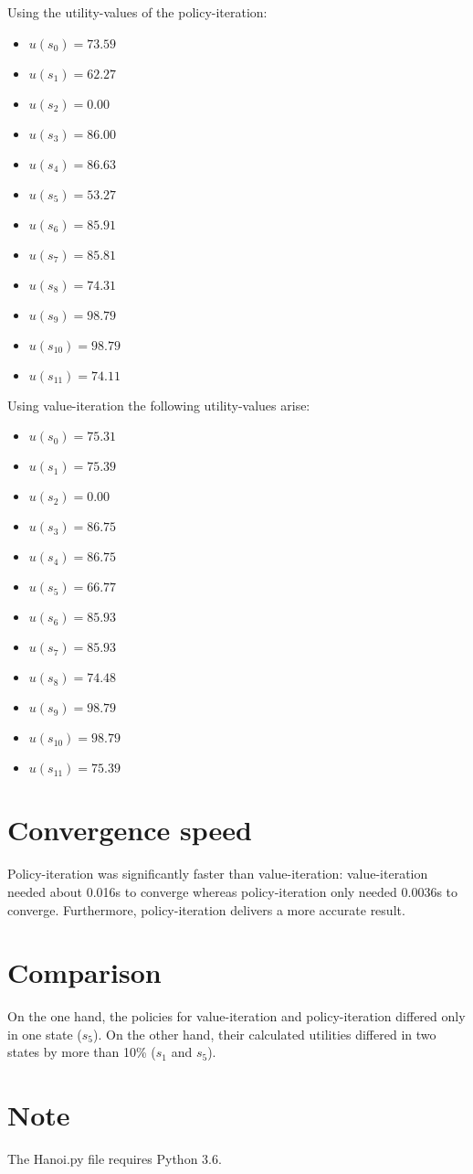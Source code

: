 \documentclass[a4paper]{article}
\begin{document}
\newpage
Using the utility-values of the policy-iteration:
\begin{multicols}{2}
\begin{itemize}
\item $u(s_0) = 73.59 $
\item $u(s_1) = 62.27 $
\item $u(s_2) = 0.00 $
\item $u(s_3) = 86.00 $
\item $u(s_4) = 86.63 $
\item $u(s_5) = 53.27 $
\item $u(s_6) = 85.91 $
\item $u(s_7) = 85.81 $
\item $u(s_8) = 74.31 $
\item $u(s_9) = 98.79 $
\item $u(s_{10}) = 98.79 $
\item $u(s_{11}) = 74.11 $
\end{itemize}
\end{multicols}

\noindent
Using value-iteration the following utility-values arise:
\begin{multicols}{2}
\begin{itemize}
\item $u(s_0) = 75.31 $
\item $u(s_1) = 75.39 $
\item $u(s_2) = 0.00 $
\item $u(s_3) = 86.75 $
\item $u(s_4) = 86.75 $
\item $u(s_5) = 66.77 $
\item $u(s_6) = 85.93 $
\item $u(s_7) = 85.93 $
\item $u(s_8) = 74.48 $
\item $u(s_9) = 98.79 $
\item $u(s_{10}) = 98.79 $
\item $u(s_{11}) = 75.39 $
\end{itemize}
\end{multicols}

\section{Convergence speed}
Policy-iteration was significantly faster than value-iteration: value-iteration needed about 0.016s to converge whereas policy-iteration only needed 0.0036s to converge. Furthermore, policy-iteration delivers a more accurate result.

\section{Comparison}
On the one hand, the policies for value-iteration and policy-iteration differed only in one state ($s_5$). On the other hand, their calculated utilities differed in two states by more than 10\% ($s_1$ and $s_5$).

\section{Note}
The Hanoi.py file requires Python 3.6.
\end{document}
